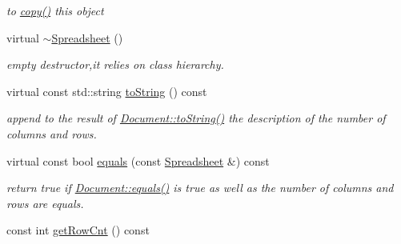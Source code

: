 \begin{DoxyCompactItemize}
\begin{DoxyCompactList}\small\item\em to \hyperlink{classdocs_1_1Spreadsheet_ad7ab608a90b53969ec97214c447c43c6}{copy()} this object \end{DoxyCompactList}\item 
\hypertarget{classdocs_1_1Spreadsheet_a5291016cd2e874e6ce3cf457723fc98c}{virtual \hyperlink{classdocs_1_1Spreadsheet_a5291016cd2e874e6ce3cf457723fc98c}{$\sim$\-Spreadsheet} ()}\label{classdocs_1_1Spreadsheet_a5291016cd2e874e6ce3cf457723fc98c}

\begin{DoxyCompactList}\small\item\em empty destructor,it relies on class hierarchy. \end{DoxyCompactList}\item 
\hypertarget{classdocs_1_1Spreadsheet_ab288d28a2f204e28f0c5d7a097f43bfa}{virtual const std\-::string \hyperlink{classdocs_1_1Spreadsheet_ab288d28a2f204e28f0c5d7a097f43bfa}{to\-String} () const }\label{classdocs_1_1Spreadsheet_ab288d28a2f204e28f0c5d7a097f43bfa}

\begin{DoxyCompactList}\small\item\em append to the result of \hyperlink{classdocs_1_1Document_a16db383045038b779eb489ad125ef02b}{Document\-::to\-String()} the description of the number of columns and rows. \end{DoxyCompactList}\item 
\hypertarget{classdocs_1_1Spreadsheet_a4272d9ebb0edce7d6e3946ca6d08c59b}{virtual const bool \hyperlink{classdocs_1_1Spreadsheet_a4272d9ebb0edce7d6e3946ca6d08c59b}{equals} (const \hyperlink{classdocs_1_1Spreadsheet}{Spreadsheet} \&) const }\label{classdocs_1_1Spreadsheet_a4272d9ebb0edce7d6e3946ca6d08c59b}

\begin{DoxyCompactList}\small\item\em return true if \hyperlink{classdocs_1_1Document_ad86b3a7c7d496f3b05c740e2c1433c78}{Document\-::equals()} is true as well as the number of columns and rows are equals. \end{DoxyCompactList}\item 
\hypertarget{classdocs_1_1Spreadsheet_a25339a2bc1be68500a907969d15b02d0}{const int \hyperlink{classdocs_1_1Spreadsheet_a25339a2bc1be68500a907969d15b02d0}{get\-Row\-Cnt} () const }\label{classdocs_1_1Spreadsheet_a25339a2bc1be68500a907969d15b02d0}


\end{DoxyCompactItemize}
